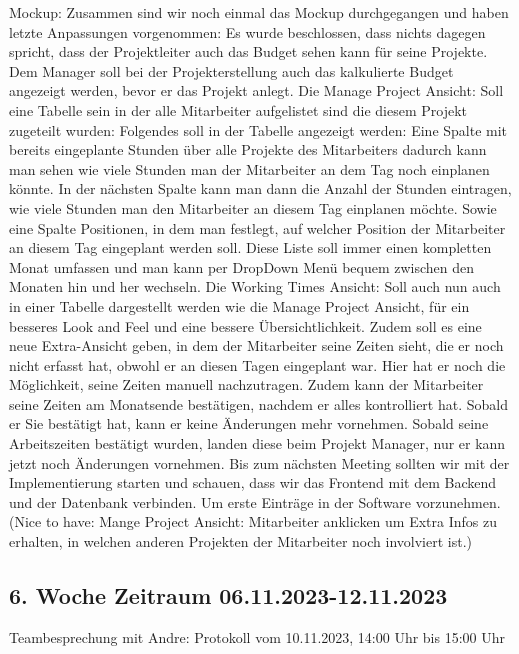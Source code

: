 \documentclass{article}
\begin{document}
Mockup: Zusammen sind wir noch einmal das Mockup durchgegangen und haben letzte
Anpassungen vorgenommen: Es wurde beschlossen, dass nichts dagegen spricht,
dass der Projektleiter auch das Budget sehen kann für seine Projekte. Dem
Manager soll bei der Projekterstellung auch das kalkulierte Budget angezeigt
werden, bevor er das Projekt anlegt. Die Manage Project Ansicht: Soll eine
Tabelle sein in der alle Mitarbeiter aufgelistet sind die diesem Projekt
zugeteilt wurden: Folgendes soll in der Tabelle angezeigt werden: Eine Spalte
mit bereits eingeplante Stunden über alle Projekte des Mitarbeiters dadurch
kann man sehen wie viele Stunden man der Mitarbeiter an dem Tag noch einplanen
könnte. In der nächsten Spalte kann man dann die Anzahl der Stunden eintragen,
wie viele Stunden man den Mitarbeiter an diesem Tag einplanen möchte. Sowie
eine Spalte Positionen, in dem man festlegt, auf welcher Position der
Mitarbeiter an diesem Tag eingeplant werden soll. Diese Liste soll immer einen
kompletten Monat umfassen und man kann per DropDown Menü bequem zwischen den
Monaten hin und her wechseln. Die Working Times Ansicht: Soll auch nun auch in
einer Tabelle dargestellt werden wie die Manage Project Ansicht, für ein
besseres Look and Feel und eine bessere Übersichtlichkeit. Zudem soll es eine
neue Extra-Ansicht geben, in dem der Mitarbeiter seine Zeiten sieht, die er
noch nicht erfasst hat, obwohl er an diesen Tagen eingeplant war. Hier hat er
noch die Möglichkeit, seine Zeiten manuell nachzutragen. Zudem kann der
Mitarbeiter seine Zeiten am Monatsende bestätigen, nachdem er alles
kontrolliert hat. Sobald er Sie bestätigt hat, kann er keine Änderungen mehr
vornehmen. Sobald seine Arbeitszeiten bestätigt wurden, landen diese beim
Projekt Manager, nur er kann jetzt noch Änderungen vornehmen. Bis zum nächsten
Meeting sollten wir mit der Implementierung starten und schauen, dass wir das
Frontend mit dem Backend und der Datenbank verbinden. Um erste Einträge in der
Software vorzunehmen. (Nice to have: Mange Project Ansicht: Mitarbeiter
anklicken um Extra Infos zu erhalten, in welchen anderen Projekten der
Mitarbeiter noch involviert ist.)

\subsection{6. Woche Zeitraum 06.11.2023-12.11.2023}
Teambesprechung mit Andre: Protokoll vom 10.11.2023, 14:00 Uhr bis 15:00 Uhr
\end{document}

